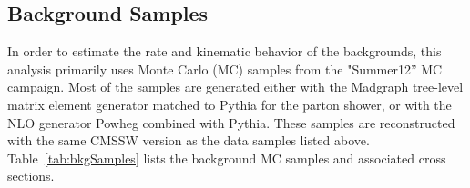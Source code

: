\subsection{Background Samples}
\label{background_sample_overview}

\par In order to estimate the rate and kinematic behavior of the
backgrounds, this analysis primarily uses Monte Carlo (MC) samples
from the "Summer12'' MC campaign.  Most of the samples are
generated either with the Madgraph tree-level matrix element generator
matched to Pythia for the parton shower, or with the NLO
generator Powheg combined with Pythia.  These samples are
reconstructed with the same CMSSW version as the data samples listed
above.  Table~\ref{tab:bkgSamples} lists the
background MC samples and associated cross sections. 

